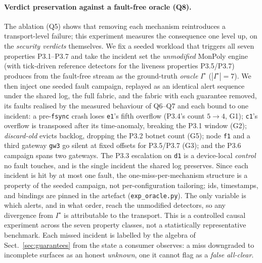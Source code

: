 \documentclass[runningheads]{llncs}
\begin{document}
\paragraph{Verdict preservation against a fault-free oracle (Q8).}
The ablation (Q5) shows that removing each mechanism reintroduces a transport-level
failure; this experiment measures the consequence one level up, on the
\emph{security verdicts} themselves. We fix a seeded workload that triggers all seven
properties P3.1--P3.7 and take the incident set the \emph{unmodified} MonPoly engine
(with tick-driven reference detectors for the liveness properties P3.5/P3.7) produces
from the fault-free stream as the ground-truth \emph{oracle} $I^\star$
($|I^\star|{=}7$). We then inject one seeded fault campaign, replayed as an identical alert sequence under the shared log,
the full fabric, and the fabric with each guarantee removed, its faults realised by the
measured behaviour of Q6--Q7 and each bound to one incident: a pre-\texttt{fsync} crash
loses \texttt{e1}'s fifth overflow (P3.4's count $5\!\to\!4$, G1); \texttt{c1}'s overflow
is transposed after its time-anomaly, breaking the P3.1 window (G2); \emph{discard-old}
evicts backlog, dropping the P3.2 botnet count (G5); node \texttt{f1} and a third gateway
\texttt{gw3} go silent at fixed offsets for P3.5/P3.7 (G3); and the P3.6 campaign spans
two gateways. The P3.3 escalation on \texttt{d1} is a device-local \emph{control} no fault
touches, and is the single incident the shared log preserves. Since each incident is hit
by at most one fault, the one-miss-per-mechanism structure is a property of the seeded
campaign, not per-configuration tailoring; ids, timestamps, and bindings are pinned in the
artefact (\texttt{exp\_oracle.py}). The only variable is which alerts, and in what order,
reach the unmodified detectors, so any divergence from $I^\star$ is attributable to the
transport. This is a controlled causal experiment across the seven property classes, not
a statistically representative benchmark.
Each missed incident is labelled by the algebra of Sect.~\ref{sec:guarantees} from the
state a consumer observes: a miss downgraded to \textsf{incomplete} surfaces as an honest
\emph{unknown}, one it cannot flag as a \emph{false all-clear}.
\end{document}
